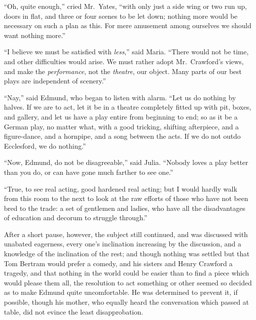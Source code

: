 \documentclass{article}
\begin{document}
``Oh, quite enough,'' cried Mr.\ Yates, ``with only just a side wing
or two run up, doors in flat, and three or four scenes to be
let down; nothing more would be necessary on such a plan as this.
For mere amusement among ourselves we should want nothing more.''

``I believe we must be satisfied with \emph{less},'' said Maria.
``There would not be time, and other difficulties
would arise.  We must rather adopt Mr.\ Crawford's views,
and make the \emph{performance}, not the \emph{theatre}, our object.
Many parts of our best plays are independent of scenery.''

``Nay,'' said Edmund, who began to listen with alarm.
``Let us do nothing by halves.  If we are to act, let it be in
a theatre completely fitted up with pit, boxes, and gallery,
and let us have a play entire from beginning to end; so as it
be a German play, no matter what, with a good tricking,
shifting afterpiece, and a figure-dance, and a hornpipe,
and a song between the acts.  If we do not outdo Ecclesford,
we do nothing.''

``Now, Edmund, do not be disagreeable,'' said Julia.
``Nobody loves a play better than you do, or can have gone
much farther to see one.''

``True, to see real acting, good hardened real acting;
but I would hardly walk from this room to the next to
look at the raw efforts of those who have not been
bred to the trade:  a set of gentlemen and ladies,
who have all the disadvantages of education and decorum
to struggle through.''

After a short pause, however, the subject still continued,
and was discussed with unabated eagerness, every one's
inclination increasing by the discussion, and a knowledge
of the inclination of the rest; and though nothing was settled
but that Tom Bertram would prefer a comedy, and his sisters
and Henry Crawford a tragedy, and that nothing in the world
could be easier than to find a piece which would please
them all, the resolution to act something or other seemed
so decided as to make Edmund quite uncomfortable.  He was
determined to prevent it, if possible, though his mother,
who equally heard the conversation which passed at table,
did not evince the least disapprobation.
\end{document}
